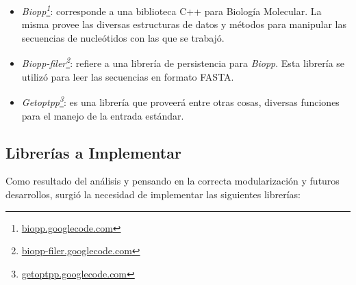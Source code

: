 \begin{itemize}
	\item \emph{Biopp\footnote{\url{biopp.googlecode.com}}}: corresponde a una biblioteca C++ para Biología Molecular. La misma
	 provee las diversas estructuras de datos y métodos para manipular las secuencias de nucleótidos con las que se trabajó. 

	\item \emph{Biopp-filer\footnote{\url{biopp-filer.googlecode.com}}}: refiere a una librería de persistencia para 
	\emph{Biopp}. Esta librería se utilizó para leer las secuencias en formato FASTA.

	\item \emph{Getoptpp\footnote{\url{getoptpp.googlecode.com}}}: es una librería que proveerá entre otras cosas, diversas
	 funciones para el manejo de la entrada estándar.
\end{itemize}

\subsection{Librerías a Implementar}
\label{libreriaAImplementar}

\par Como resultado del análisis y pensando en la correcta modularización y futuros desarrollos, surgió la necesidad de implementar las siguientes librerías: 

